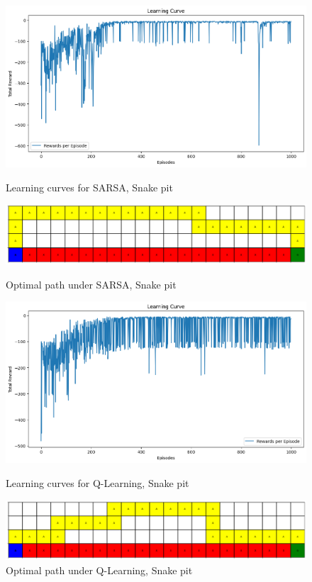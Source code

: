 \documentclass[12pt]{article}
\begin{document}
\begin{figure}[ht]
    \centering
    \begin{minipage}[b]{0.48\textwidth}
        \centering
        \includegraphics[width=\textwidth]{image/L3.1.png}
        \caption{\scriptsize Learning curves for SARSA, Snake pit}
        \includegraphics[width=\textwidth]{image/R3.1.png}
        \caption{\scriptsize Optimal path under SARSA, Snake pit}
    \end{minipage}
    \hfill
    \begin{minipage}[b]{0.48\textwidth}
        \centering
        \includegraphics[width=\textwidth]{image/L3.2.png}
        \caption{\scriptsize Learning curves for Q-Learning, Snake pit}
        \includegraphics[width=\textwidth]{image/R3.2.png}
        \caption{\scriptsize Optimal path under Q-Learning, Snake pit}
    \end{minipage}
\end{figure}
\end{document}
